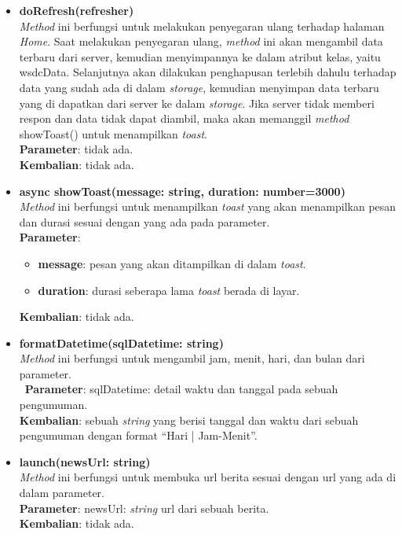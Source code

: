 \begin{enumerate}
\begin{itemize}
		\item \textbf{doRefresh(refresher)} \\
			\textit{Method} ini berfungsi untuk melakukan penyegaran ulang terhadap halaman \textit{Home}. Saat melakukan penyegaran ulang, \textit{method} ini akan mengambil data terbaru dari server, kemudian menyimpannya ke dalam atribut kelas, yaitu wsdcData. Selanjutnya akan dilakukan penghapusan terlebih dahulu terhadap data yang sudah ada di dalam \textit{storage}, kemudian menyimpan data terbaru yang di dapatkan dari server ke dalam \textit{storage}. Jika server tidak memberi respon dan data tidak dapat diambil, maka akan memanggil \textit{method} showToast() untuk menampilkan \textit{toast}. \\
			\textbf{Parameter}: tidak ada. \\
			\textbf{Kembalian}: tidak ada.
			
		\item \textbf{async showToast(message: string, duration: number=3000)}\\
			\textit{Method} ini berfungsi untuk menampilkan \textit{toast} yang akan menampilkan pesan dan durasi sesuai dengan yang ada pada parameter.\\
			\newpage
			\textbf{Parameter}:
			\begin{itemize}
				\item \textbf{message}: pesan yang akan ditampilkan di dalam \textit{toast}.
				\item \textbf{duration}: durasi seberapa lama \textit{toast} berada di layar.
			\end{itemize}
			\textbf{Kembalian}: tidak ada.
			
		\item \textbf{formatDatetime(sqlDatetime: string)}\\
			\textit{Method} ini berfungsi untuk mengambil jam, menit, hari, dan bulan dari parameter. \\\
			\textbf{Parameter}: sqlDatetime: detail waktu dan tanggal pada sebuah pengumuman. \\
			\textbf{Kembalian}: sebuah \textit{string} yang berisi tanggal dan waktu dari sebuah pengumuman dengan format ``Hari | Jam-Menit''.
			
		\item \textbf{launch(newsUrl: string)}\\
			\textit{Method} ini berfungsi untuk membuka url berita sesuai dengan url yang ada di dalam parameter. \\
			\textbf{Parameter}: newsUrl: \textit{string} url dari sebuah berita. \\
			\textbf{Kembalian}: tidak ada.
			

\end{itemize}
\end{enumerate}
